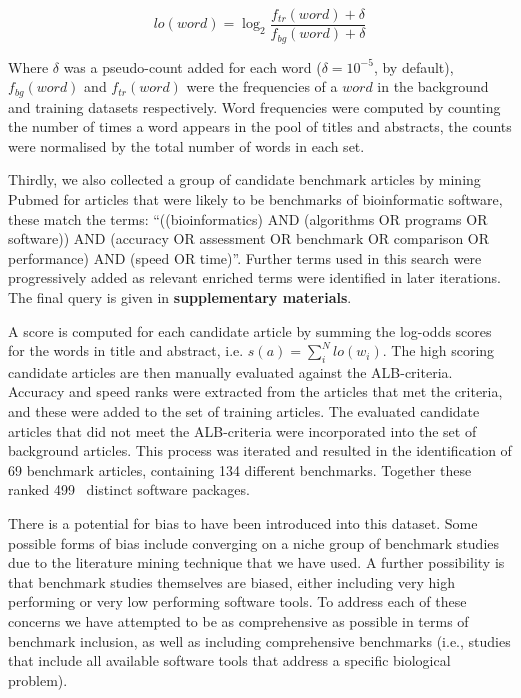 \documentclass{bmcart}
\def\numTools{499}
\def\numBenchmarkPubs{69}
\def\numBenchmarks{134}
\begin{document}
{\[lo(word)=\log_2\frac{f_{tr}(word)+\delta}{f_{bg}(word)+\delta}\] 

Where
$\delta$
was a pseudo-count added for each word ($\delta = 10^{-5}$, by default),
$f_{bg}(word)$ and $f_{tr}(word)$ were the frequencies of a $word$ in
the background and training datasets respectively. Word frequencies
were computed by counting the number of times a word appears in the
pool of titles and abstracts, the counts were normalised by the total
number of words in each set.

Thirdly, we also collected a group of candidate benchmark articles by
mining Pubmed for articles that were likely to be benchmarks of
bioinformatic software, these match the terms: “((bioinformatics)
AND (algorithms OR programs OR software)) AND (accuracy OR assessment
OR benchmark OR comparison OR performance) AND (speed OR
time)”. Further terms used in this search were progressively added as
relevant enriched terms were identified in later iterations. The final
query is given in \textbf{supplementary materials}.

A score is computed for each candidate article by summing the log-odds
scores for the words in title and abstract,
i.e. $s(a)=\sum_i^Nlo(w_i)$. The high scoring candidate articles are
then manually evaluated against the ALB-criteria. Accuracy and speed
ranks were extracted from the articles that met the criteria, and
these were added to the set of training articles. The evaluated
candidate articles that did not meet the ALB-criteria were incorporated
into the set of background articles. This process was iterated and resulted in the identification of
{\color{black}\numBenchmarkPubs} benchmark articles,
containing {\color{black}\numBenchmarks} different benchmarks. Together these
ranked {\color{black}\numTools~} distinct software packages.

There is a potential for bias to have been introduced into this
dataset. Some possible forms of bias include converging on a niche
group of benchmark studies due to the literature mining technique that
we have used. A further possibility is that benchmark studies
themselves are biased, either including very high performing or very
low performing software tools. To address each of these concerns we
have attempted to be as comprehensive as possible in terms of
benchmark inclusion, as well as including comprehensive benchmarks (i.e.,
studies that include all available software tools that
address a specific biological problem).

}
\end{document}
